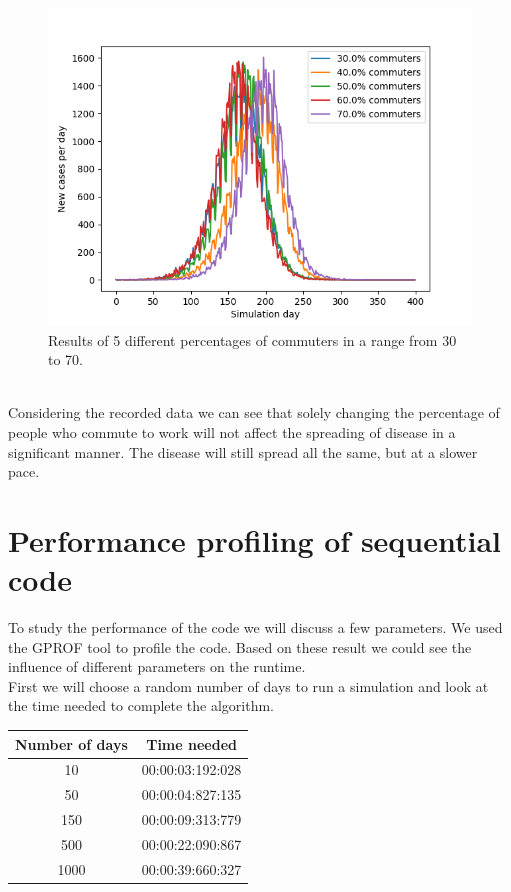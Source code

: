 \documentclass[runningheads]{llncs}
\begin{document}
\begin{figure}
	\includegraphics[width=\textwidth]{test_30-70.png}
	\caption{Results of 5 different percentages of commuters in a range from 30 to 70.}
\end{figure}
\\
Considering the recorded data we can see that solely changing the percentage of people who commute to work will not affect the spreading of disease in a significant manner. The disease will still spread all the same, but at a slower pace. 
\newpage
\section{Performance profiling of sequential code}
To study the performance of the code we will discuss a few parameters. We used the GPROF tool to profile the code. Based on these result we could see the influence of different parameters on the runtime.
\\
First we will choose a random number of days to run a simulation and look at the time needed to complete the algorithm.

\begin{center}
	\begin{tabular}{ | c | c |}
	\hline
	Number of days & Time needed \\ \hline
	10 & 00:00:03:192:028 \\ \hline
	50 & 00:00:04:827:135 \\ \hline
	150 & 00:00:09:313:779 \\ \hline
	500 & 00:00:22:090:867 \\ \hline
	1000 & 00:00:39:660:327 \\
	\hline	
	\end{tabular}
\end{center}
\end{document}
